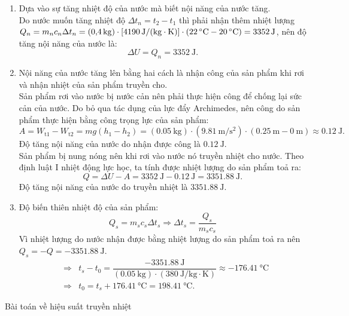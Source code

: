 \begin{vd}
{			\begin{enumerate}[label=\alph*)]
				\item Dựa vào sự tăng nhiệt độ của nước mà biết nội năng của nước tăng.\\
				Do nước muốn tăng nhiệt độ $\Delta t_n=t_2-t_1$ thì phải nhận thêm nhiệt lượng $Q_n=m_nc_n\Delta t_n=\left(\SI{0.4}{\kilogram}\right)\cdot\left[\SI{4190}{\joule/\left(\kilogram\cdot\kelvin\right)}\right]\cdot\left(\SI{22}{\celsius}-\SI{20}{\celsius}\right)=\SI{3352}{\joule}$, nên độ tăng nội năng của nước là:
				$$\Delta U=Q_n=\SI{3352}{\joule}.$$
				\item Nội năng của nước tăng lên bằng hai cách là nhận công của sản phẩm khi rơi và nhận nhiệt của sản phẩm truyền cho.\\
				Sản phẩm rơi vào nước bị nước cản nên phải thực hiện công để chống lại sức cản của nước. Do bỏ qua tác dụng của lực đẩy Archimedes, nên công do sản phẩm thực hiện bằng công trọng lực của sản phẩm:
				$$A=W_\text{t1}-W_\text{t2}=mg\left(h_1-h_2\right)=\left(\SI{0.05}{\kilogram}\right)\cdot\left(\SI{9.81}{\meter/\second^2}\right)\cdot\left(\SI{0.25}{\meter}-\SI{0}{\meter}\right)\approx\SI{0.12}{\joule}.$$
				Độ tăng nội năng của nước do nhận được công là $\SI{0.12}{\joule}$.\\
				Sản phẩm bị nung nóng nên khi rơi vào nước nó truyền nhiệt cho nước. Theo định luật I nhiệt động lực học, ta tính được nhiệt lượng do sản phẩm toả ra:
				$$Q=\Delta U-A=\SI{3352}{\joule}-\SI{0.12}{\joule}=\SI{3351.88}{\joule}.$$
				Độ tăng nội năng của nước do truyền nhiệt là $\SI{3351.88}{\joule}.$
				\item Độ biến thiên nhiệt độ của sản phẩm:
				$$Q_s=m_sc_s\Delta t_s\Rightarrow \Delta t_s=\dfrac{Q_s}{m_sc_s}$$
				Vì nhiệt lượng do nước nhận được bằng nhiệt lượng do sản phẩm toả ra nên $Q_s=-Q=-\SI{3351.88}{\joule}.$
				\begin{eqnarray*}
					&	\Rightarrow& t_s-t_0=\dfrac{-\SI{3351.88}{\joule}}{\left(\SI{0.05}{\kilogram}\right)\cdot\left(\SI{380}{\joule/\kilogram\cdot\kelvin}\right)}\approx-\SI{176.41}{\celsius}
					\\
					&\Rightarrow& t_0=t_s+\SI{176.41}{\celsius}=\SI{198.41}{\celsius}.
				\end{eqnarray*}
		\end{enumerate}}
\end{vd}
\begin{dang}{Bài toán về hiệu suất truyền nhiệt}
\end{dang}
